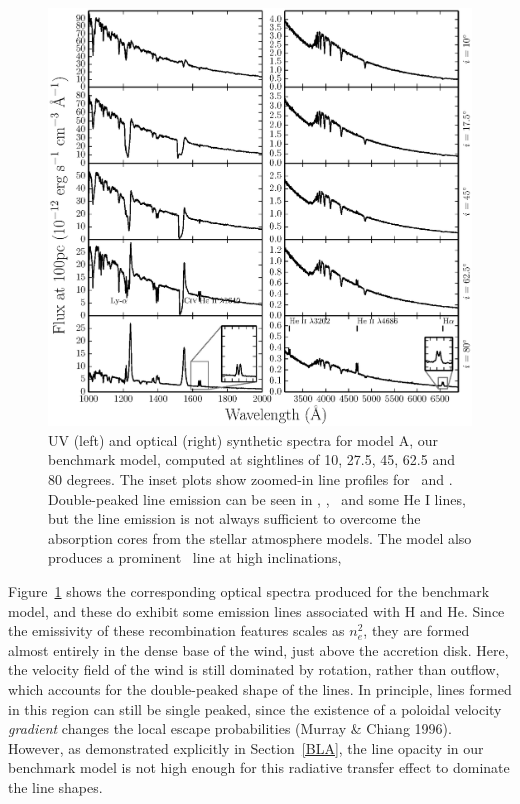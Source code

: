 \documentclass[preprint, a4paper, 11pt]{aastex}
\begin{document}
\begin{figure} %
\includegraphics[width=\textwidth]{figures/fig5_uv_opt.eps}
\caption{
UV (left) and optical (right) synthetic spectra for model A, our benchmark model,
computed at sightlines of 10, 27.5, 45, 62.5 and 80 degrees.	
The inset plots show zoomed-in line profiles for 
\heiiuv\ and \ha. Double-peaked line emission can be seen in 
\heiiuv, \heiiopt, \ha\ and some He I lines, but the 
line emission is not always sufficient to overcome the absorption
cores from the stellar atmosphere models. The model
also produces a prominent \heiioptnew\ line at high inclinations,
}
\label{spec}
\end{figure} %

Figure~\ref{spec} shows the corresponding optical spectra produced for
the benchmark model, and these do exhibit some emission lines
associated with H and He. Since the emissivity of these recombination 
features scales as $n_e^2$, they are formed almost entirely in the 
dense base of the wind, just above the accretion disk. Here, the
velocity field of the wind is still dominated by rotation, rather than
outflow, which accounts for the double-peaked shape of the lines. In
principle, lines formed in this region can still be single peaked,
since the existence of a poloidal velocity {\em gradient} changes the
local escape probabilities (Murray \& Chiang 1996). However, as
demonstrated explicitly in Section~\ref{BLA}, the line opacity in our
benchmark model is not high enough for this radiative transfer effect
to dominate the line shapes.
\end{document}

